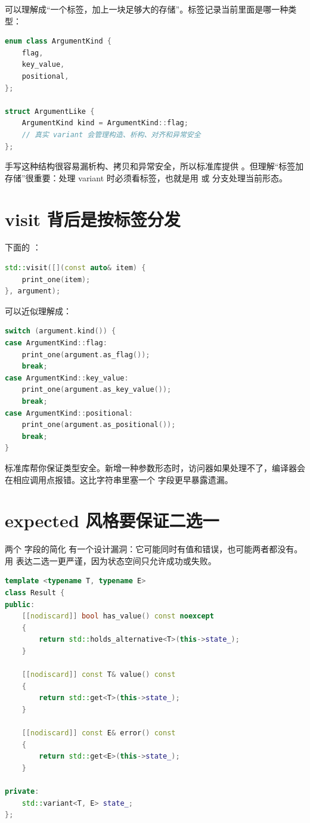  可以理解成“一个标签，加上一块足够大的存储”。标签记录当前里面是哪一种类型：

\begin{lstlisting}[language=C++,caption={variant 的近似状态}]
enum class ArgumentKind {
    flag,
    key_value,
    positional,
};

struct ArgumentLike {
    ArgumentKind kind = ArgumentKind::flag;
    // 真实 variant 会管理构造、析构、对齐和异常安全
};
\end{lstlisting}

手写这种结构很容易漏析构、拷贝和异常安全，所以标准库提供 。但理解“标签加存储”很重要：处理 variant 时必须看标签，也就是用  或  分支处理当前形态。

\section{visit 背后是按标签分发}

下面的 ：

\begin{lstlisting}[language=C++,caption={visit 处理三种参数}]
std::visit([](const auto& item) {
    print_one(item);
}, argument);
\end{lstlisting}

可以近似理解成：

\begin{lstlisting}[language=C++,caption={按当前标签分发}]
switch (argument.kind()) {
case ArgumentKind::flag:
    print_one(argument.as_flag());
    break;
case ArgumentKind::key_value:
    print_one(argument.as_key_value());
    break;
case ArgumentKind::positional:
    print_one(argument.as_positional());
    break;
}
\end{lstlisting}

标准库帮你保证类型安全。新增一种参数形态时，访问器如果处理不了，编译器会在相应调用点报错。这比字符串里塞一个  字段更早暴露遗漏。

\section{expected 风格要保证二选一}

两个  字段的简化  有一个设计漏洞：它可能同时有值和错误，也可能两者都没有。用  表达二选一更严谨，因为状态空间只允许成功或失败。

\begin{lstlisting}[language=C++,caption={二选一结果的最小接口}]
template <typename T, typename E>
class Result {
public:
    [[nodiscard]] bool has_value() const noexcept
    {
        return std::holds_alternative<T>(this->state_);
    }

    [[nodiscard]] const T& value() const
    {
        return std::get<T>(this->state_);
    }

    [[nodiscard]] const E& error() const
    {
        return std::get<E>(this->state_);
    }

private:
    std::variant<T, E> state_;
};
\end{lstlisting}

